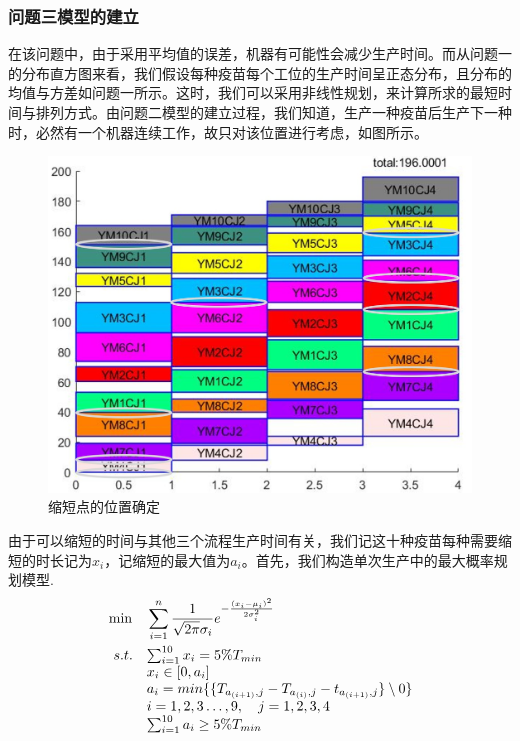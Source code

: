 \documentclass{ctexart}
\begin{document}
\subsubsection{问题三模型的建立}
在该问题中，由于采用平均值的误差，机器有可能性会减少生产时间。而从问题一的分布直方图来看，我们假设每种疫苗每个工位的生产时间呈正态分布，且分布的均值与方差如问题一所示。这时，我们可以采用非线性规划，来计算所求的最短时间与排列方式。由问题二模型的建立过程\cite{ref2}，我们知道，生产一种疫苗后生产下一种时，必然有一个机器连续工作，故只对该位置进行考虑，如图所示。\par
\begin{figure}[h]
\centerline{\includegraphics[width=0.55\linewidth]{A3图片/pre.JPG}}
\caption{缩短点的位置确定}
\label{pre}
\end{figure}
由于可以缩短的时间与其他三个流程生产时间有关，我们记这十种疫苗每种需要缩短的时长记为$x_i$，记缩短的最大值为$a_i$。首先，我们构造单次生产中的最大概率规划模型.
\begin{align*}
&\min \quad \sum_{i=1}^{n}\frac{1}{\sqrt{2\pi}\sigma_{i}}e^{-\frac{(x_i-\mu_i)^2}{2\sigma_{i}^2}}\\
& \begin{array}{r@{\quad}l@{}l@{\quad}l}
s.t. & \sum_{i=1}^{10}x_i = 5\%T_{min}\\
& x_i \in [0,a_i]\\
& a_i = min\{\{T_{a_{(i+1)},j}-T_{a_{(i)},j}-t_{a_{(i+1)},j}\}\setminus0\}\\ &i=1,2,3\ldots,9, \quad j=1,2,3,4\\
& \sum_{i=1}^{10}a_i \geq 5\%T_{min}
\end{array}
\end{align*}\par
\end{document}
